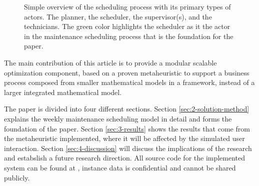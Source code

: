 \begin{figure}
	
	\caption{Simple overview of the scheduling process with its primary types of actors. The planner, the scheduler, the supervisor(s), and the technicians.
		The green color highlights the scheduler as it the actor in the maintenance scheduling process that is the foundation for the paper.}
	\label{fig:integrated:maintenance-process}
\end{figure}

The main contribution of this article is to provide a
modular scalable optimization component,  based on a proven
metaheuristic to support a business process composed from
smaller mathematical  models in a framework, instead of a
larger integrated mathematical model.

The paper is divided into four different sections. Section \ref{sec:2-solution-method} explains
the weekly maintenance scheduling model in detail and forms the foundation of the paper. 
Section \ref{sec:3-results} shows the results that come from the metaheuristic implemented,
where it will be affected by the simulated user interaction. Section \ref{sec:4-discussion} 
will discuss the implications of the research and estabslish a future research direction.
All source code for the implemented system can be found at \citep{scipo-code-ordinator_api},
instance data is confidential and cannot be shared publicly.

